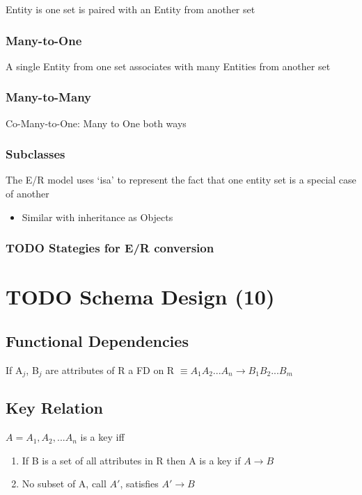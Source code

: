 \documentclass[11pt]{article}
\begin{document}
    Entity is one set is paired with an Entity from another set
\subsubsection{Many-to-One}
\label{sec-2.3.2}

    A single Entity from one set associates with many Entities from
    another set
\subsubsection{Many-to-Many}
\label{sec-2.3.3}

    Co-Many-to-One: Many to One both ways
\subsubsection{Subclasses}
\label{sec-2.3.4}

    The E/R model uses `isa' to represent the fact that one entity set
    is a special case of another
\begin{itemize}
\item Similar with inheritance as Objects
\end{itemize}
\subsubsection{\textbf{TODO} Stategies for E/R conversion}
\label{sec-2.3.5}

\section{\textbf{TODO} Schema Design (10)}
\label{sec-3}

\subsection{Functional Dependencies}
\label{sec-3.1}

   If A$_j$, B$_j$ are attributes of R a FD on R $\equiv A_1A_2...A_n
   \rightarrow B_1B_2...B_m$
\subsection{Key Relation}
\label{sec-3.2}

   $A = {A_1,A_2,...A_n}$ is a key iff
\begin{enumerate}
\item If B is a set of all attributes in R then A is a key if
      $A\rightarrow B$
\item No subset of A, call $A'$, satisfies $A' \rightarrow B$
\end{enumerate}
\end{document}
